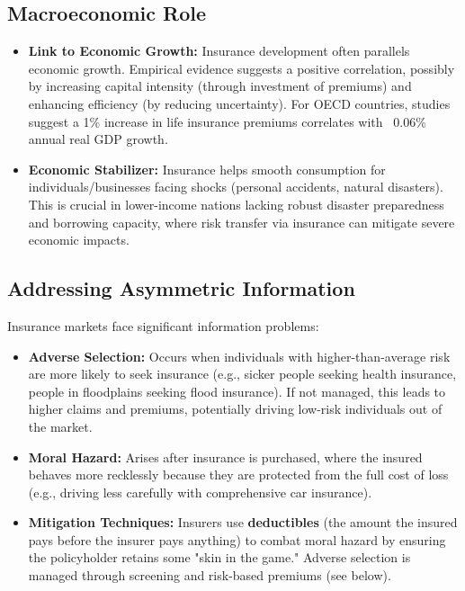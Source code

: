 \subsection{Macroeconomic Role}
\begin{itemize}
    \item \textbf{Link to Economic Growth:} Insurance development often parallels economic growth. Empirical evidence suggests a positive correlation, possibly by increasing capital intensity (through investment of premiums) and enhancing efficiency (by reducing uncertainty). For OECD countries, studies suggest a 1\% increase in life insurance premiums correlates with ~0.06\% annual real GDP growth.
    \item \textbf{Economic Stabilizer:} Insurance helps smooth consumption for individuals/businesses facing shocks (personal accidents, natural disasters). This is crucial in lower-income nations lacking robust disaster preparedness and borrowing capacity, where risk transfer via insurance can mitigate severe economic impacts.
\end{itemize}

\subsection{Addressing Asymmetric Information}
Insurance markets face significant information problems:
\begin{itemize}
    \item \textbf{Adverse Selection:} Occurs when individuals with higher-than-average risk are more likely to seek insurance (e.g., sicker people seeking health insurance, people in floodplains seeking flood insurance). If not managed, this leads to higher claims and premiums, potentially driving low-risk individuals out of the market.
    \item \textbf{Moral Hazard:} Arises after insurance is purchased, where the insured behaves more recklessly because they are protected from the full cost of loss (e.g., driving less carefully with comprehensive car insurance).
    \item \textbf{Mitigation Techniques:} Insurers use \textbf{deductibles} (the amount the insured pays before the insurer pays anything) to combat moral hazard by ensuring the policyholder retains some "skin in the game." Adverse selection is managed through screening and risk-based premiums (see below).
\end{itemize}

